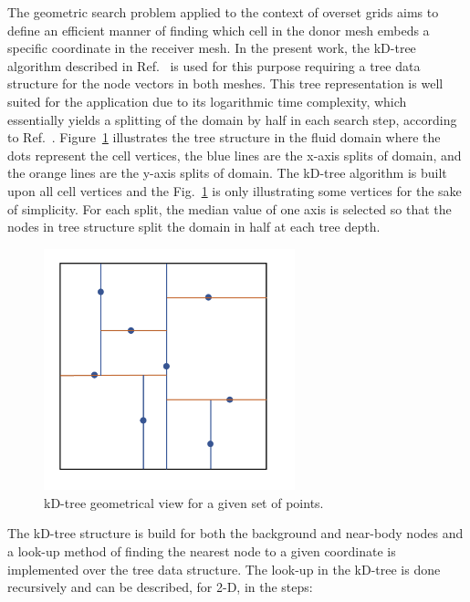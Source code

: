 The geometric search problem applied to the context of overset grids aims to define an efficient manner of finding which cell in the donor mesh embeds a specific coordinate in the receiver mesh. In the present work, the kD-tree algorithm described in Ref.\ \cite{Bentley1975} is used for this purpose requiring a tree data structure for the node vectors in both meshes. This tree representation is well suited for the application due to its logarithmic time complexity, which essentially yields a splitting of the domain by half in each search step, according to Ref.\ \cite{Skrodzki2019}. Figure\ \ref{fig:kdtree} illustrates the tree structure in the fluid domain where the dots represent the cell vertices, the blue lines are the x-axis splits of domain, and the orange lines are the y-axis splits of domain. The kD-tree algorithm is built upon all cell vertices and the Fig.\ \ref{fig:kdtree} is only illustrating some vertices for the sake of simplicity. For each split, the median value of one axis is selected so that the nodes in tree structure split the domain in half at each tree depth. 
\begin{figure}[H]
	\centering
	\includegraphics[height=7.0cm]{figs/overset/kdtree.png}
    \caption{kD-tree geometrical view for a given set of points.}
    \label{fig:kdtree}
\end{figure}

The kD-tree structure is build for both the background and near-body nodes and a look-up method of finding the nearest node to a given coordinate is implemented over the tree data structure. The look-up in the kD-tree is done recursively and can be described, for 2-D, in the steps:

